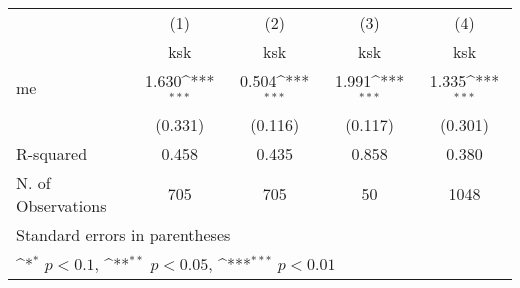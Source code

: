 {
\def\sym#1{\ifmmode^{#1}\else\(^{#1}\)\fi}
\begin{tabular}{l*{4}{c}}
\hline\hline
            &\multicolumn{1}{c}{(1)}&\multicolumn{1}{c}{(2)}&\multicolumn{1}{c}{(3)}&\multicolumn{1}{c}{(4)}\\
            &\multicolumn{1}{c}{ksk}&\multicolumn{1}{c}{ksk}&\multicolumn{1}{c}{ksk}&\multicolumn{1}{c}{ksk}\\
\hline
me          &       1.630\sym{***}&       0.504\sym{***}&       1.991\sym{***}&       1.335\sym{***}\\
            &     (0.331)         &     (0.116)         &     (0.117)         &     (0.301)         \\
\hline
R-squared   &       0.458         &       0.435         &       0.858         &       0.380         \\
N. of Observations &         705         &         705         &          50         &        1048         \\
\hline\hline
\multicolumn{5}{l}{\footnotesize Standard errors in parentheses}\\
\multicolumn{5}{l}{\footnotesize \sym{*} \(p<0.1\), \sym{**} \(p<0.05\), \sym{***} \(p<0.01\)}\\
\end{tabular}
}
